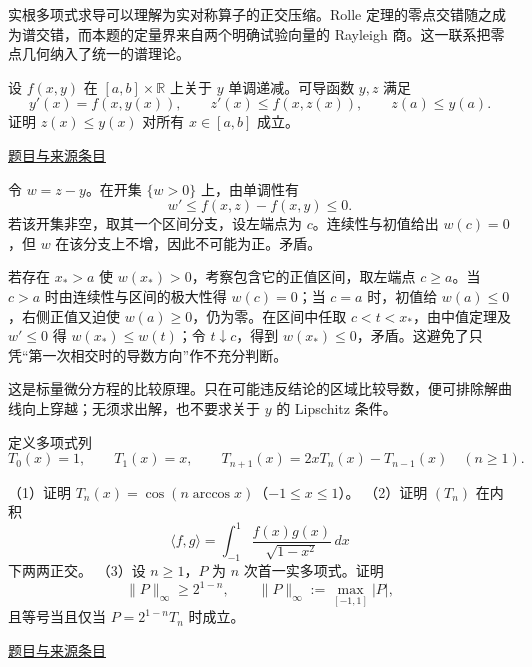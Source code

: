 \documentclass[UTF8,12pt,a4paper,fontset=fandol]{ctexart}
\begin{document}
\begin{remark}[方法与条件]实根多项式求导可以理解为实对称算子的正交压缩。Rolle 定理的零点交错随之成为谱交错，而本题的定量界来自两个明确试验向量的 Rayleigh 商。这一联系把零点几何纳入了统一的谱理论。\end{remark}

\begin{example}[来源序号5]\label{ex:fin05-hi:5}\label{pr:fin05-hi:5}

设 $f(x,y)$ 在 $[a,b]\times\mathbb R$ 上关于 $y$ 单调递减。可导函数 $y,z$ 满足
\[
y'(x)=f(x,y(x)),\qquad z'(x)\le f(x,z(x)),\qquad z(a)\le y(a).
\]
证明 $z(x)\le y(x)$ 对所有 $x\in[a,b]$ 成立。

\par\href{https://github.com/lzxcr/cmc-mathematics/blob/64916fa1fdbc3e444a652eca204d5669058ee321/src/problems/finals/05/05.md}{题目与来源条目}

\end{example}

\begin{solve}\label{ans:fin05-hi:5}

令 $w=z-y$。在开集 $\{w>0\}$ 上，由单调性有
\[
w'\le f(x,z)-f(x,y)\le0.
\]
若该开集非空，取其一个区间分支，设左端点为 $c$。连续性与初值给出 $w(c)=0$，但 $w$ 在该分支上不增，因此不可能为正。矛盾。

若存在 $x_*>a$ 使 $w(x_*)>0$，考察包含它的正值区间，取左端点 $c\ge a$。当 $c>a$ 时由连续性与区间的极大性得 $w(c)=0$；当 $c=a$ 时，初值给 $w(a)\le0$，右侧正值又迫使 $w(a)\ge0$，仍为零。在区间中任取 $c<t<x_*$，由中值定理及 $w'\le0$ 得 $w(x_*)\le w(t)$；令 $t\downarrow c$，得到 $w(x_*)\le0$，矛盾。这避免了只凭“第一次相交时的导数方向”作不充分判断。

\end{solve}

\begin{remark}[方法与条件]这是标量微分方程的比较原理。只在可能违反结论的区域比较导数，便可排除解曲线向上穿越；无须求出解，也不要求关于 $y$ 的 Lipschitz 条件。\end{remark}

\begin{example}\label{ex:fin05-hi:11}\label{pr:fin05-hi:11}

定义多项式列
\[
T_0(x)=1,\qquad T_1(x)=x,\qquad
T_{n+1}(x)=2xT_n(x)-T_{n-1}(x)\quad(n\ge1).
\]

（1）证明 $T_n(x)=\cos(n\arccos x)$（$-1\le x\le1$）。
（2）证明 $(T_n)$ 在内积
\[
\langle f,g\rangle=\int_{-1}^1\frac{f(x)g(x)}{\sqrt{1-x^2}}\,dx
\]
下两两正交。
（3）设 $n\ge1$，$P$ 为 $n$ 次首一实多项式。证明
\[
\|P\|_\infty\ge2^{1-n},\qquad
\|P\|_\infty:=\max_{[-1,1]}|P|,
\]
且等号当且仅当 $P=2^{1-n}T_n$ 时成立。

\par\href{https://github.com/lzxcr/cmc-mathematics/blob/64916fa1fdbc3e444a652eca204d5669058ee321/src/problems/finals/05/12.md}{题目与来源条目}

\end{example}
\end{document}
